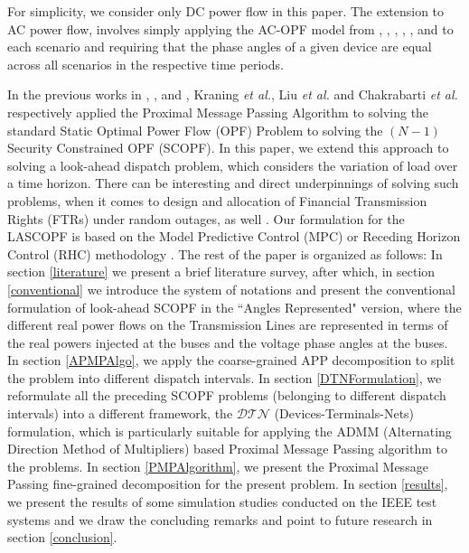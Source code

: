\documentclass[preprint,12pt,3p]{elsarticle}
\begin{document}
For simplicity, we consider only DC power flow in this paper.  The extension to AC power flow, involves simply applying the AC-OPF model from \cite{BWW:08}, \cite{LL:12}, \cite{SL:12a}, \cite{SL:12b}, \cite{LTZ:12}, and \cite{E:14} to each scenario and requiring that the phase angles of a given device are equal across all scenarios in the respective time periods. 

In the previous works in \cite{KC:13}, \cite{LKWZ:13}, and \cite{CK:14}, Kraning \emph{et al.}, Liu \emph{et al.} and Chakrabarti \emph{et al.} respectively applied the Proximal Message Passing Algorithm to solving the standard Static Optimal Power Flow (OPF) Problem to solving the $(N-1)$ Security Constrained OPF (SCOPF). In this paper, we extend this approach to solving a look-ahead dispatch problem, which considers the variation of load over a time horizon. There can be interesting and direct underpinnings of solving such problems, when it comes to design and allocation of Financial Transmission Rights (FTRs) under random outages, as well \cite{SamMo2018}. Our formulation for the LASCOPF is based on the Model Predictive Control (MPC) or Receding Horizon Control (RHC) methodology \cite{QB:03,CTHK:03,Her:05,TR:04,KW:11}. The rest of the paper is organized as follows: In section \ref{literature} we present a brief literature survey, after which, in section \ref{conventional} we introduce the system of notations and present the conventional formulation of look-ahead SCOPF in the ``Angles Represented" version, where the different real power flows on the Transmission Lines are represented in terms of the real powers injected at the buses and the voltage phase angles at the buses. In section \ref{APMPAlgo}, we apply the coarse-grained APP decomposition to split the problem into different dispatch intervals. In section \ref{DTNFormulation}, we reformulate all the preceding SCOPF problems (belonging to different dispatch intervals) into a different framework, the $\mathcal{DTN}$ (Devices-Terminals-Nets) formulation, which is particularly suitable for applying the ADMM (Alternating Direction Method of Multipliers) \cite{BP:11} based Proximal Message Passing algorithm to the problems. In section \ref{PMPAlgorithm}, we present the Proximal Message Passing fine-grained decomposition for the present problem. In section \ref{results}, we present the results of some simulation studies conducted on the IEEE test systems and we draw the concluding remarks and point to future research in section \ref{conclusion}.


\end{document}
